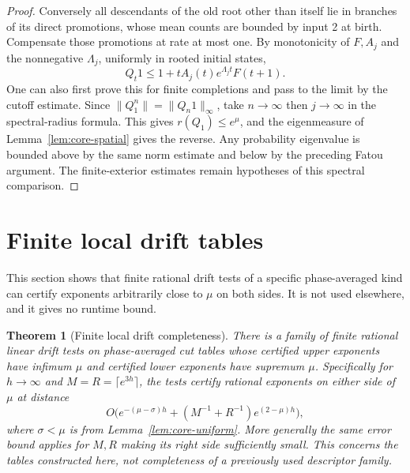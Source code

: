 \documentclass[11pt]{article}
\newtheorem{theorem}{Theorem}
\newcommand{\resulttag}{?}
\newcommand{\tagnext}[1]{\renewcommand{\resulttag}{#1}}
\newcommand{\sectag}[1]{\renewcommand{\thesection}{#1}\renewcommand{\theHsection}{#1}}
\theoremstyle{remark}
\numberwithin{equation}{section}
\begin{document}
\begin{proof}
Conversely all descendants of the old root other than itself lie in branches of its direct promotions, whose mean counts are bounded by input 2 at birth. Compensate those promotions at rate at most one. By monotonicity of $F,A_j$ and the nonnegative $\Lambda_j$, uniformly in rooted initial states,
\[
 Q_t1\le1+t A_j(t)e^{\Lambda_jt}F(t+1).
\]
One can also first prove this for finite completions and pass to the limit by the cutoff estimate. Since $\|Q_1^n\|=\|Q_n1\|_\infty$, take $n\to\infty$ then $j\to\infty$ in the spectral-radius formula. This gives $r(Q_1)\le e^\mu$, and the eigenmeasure of Lemma~\ref{lem:core-spatial} gives the reverse. Any probability eigenvalue is bounded above by the same norm estimate and below by the preceding Fatou argument. The finite-exterior estimates remain hypotheses of this spectral comparison.
\end{proof}

\sectag{DRF}
\section{Finite local drift tables}\label{sec:drf}
This section shows that finite rational drift tests of a specific phase-averaged kind can certify exponents arbitrarily close to $\mu$ on both sides. It is not used elsewhere, and it gives no runtime bound.
\tagnext{DRF}
\begin{theorem}[Finite local drift completeness]\label{th:core-drift}
There is a family of finite rational linear drift tests on phase-averaged cut tables whose certified upper exponents have infimum $\mu$ and certified lower exponents have supremum $\mu$. Specifically for $h\to\infty$ and $M=R=\lceil e^{3h}\rceil$, the tests certify rational exponents on either side of $\mu$ at distance
\[
 O\big(e^{-(\mu-\sigma)h}+(M^{-1}+R^{-1})e^{(2-\mu)h}\big),
\]
where $\sigma<\mu$ is from Lemma~\ref{lem:core-uniform}. More generally the same error bound applies for $M,R$ making its right side sufficiently small. This concerns the tables constructed here, not completeness of a previously used descriptor family.
\end{theorem}
\end{document}
